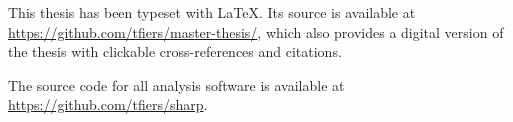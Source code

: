 \clearpage
\vspace*{\fill}
This thesis has been typeset with \LaTeX. Its source is available at \url{https://github.com/tfiers/master-thesis/}, which also provides a digital version of the thesis with clickable cross-references and citations.

The source code for all analysis software is available at \url{https://github.com/tfiers/sharp}.

